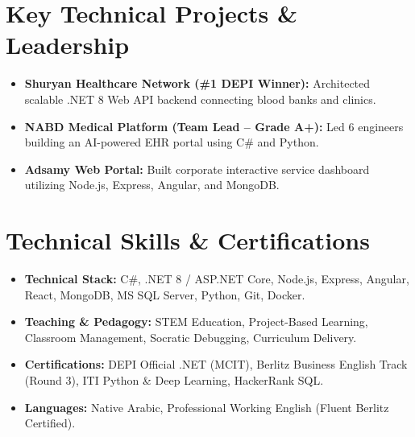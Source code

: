 \documentclass[11pt,a4paper]{article}
\begin{document}
\section{Key Technical Projects \& Leadership}
\begin{itemize}[leftmargin=*, nosep]
    \item \textbf{Shuryan Healthcare Network (\#1 DEPI Winner):} Architected scalable .NET 8 Web API backend connecting blood banks and clinics.
    \item \textbf{NABD Medical Platform (Team Lead -- Grade A+):} Led 6 engineers building an AI-powered EHR portal using C\# and Python.
    \item \textbf{Adsamy Web Portal:} Built corporate interactive service dashboard utilizing Node.js, Express, Angular, and MongoDB.
\end{itemize}

\section{Technical Skills \& Certifications}
\begin{itemize}[leftmargin=*, nosep]
    \item \textbf{Technical Stack:} C\#, .NET 8 / ASP.NET Core, Node.js, Express, Angular, React, MongoDB, MS SQL Server, Python, Git, Docker.
    \item \textbf{Teaching \& Pedagogy:} STEM Education, Project-Based Learning, Classroom Management, Socratic Debugging, Curriculum Delivery.
    \item \textbf{Certifications:} DEPI Official .NET (MCIT), Berlitz Business English Track (Round 3), ITI Python \& Deep Learning, HackerRank SQL.
    \item \textbf{Languages:} Native Arabic, Professional Working English (Fluent Berlitz Certified).
\end{itemize}
\end{document}
